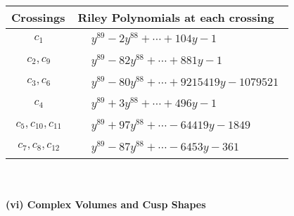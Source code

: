 \documentclass[1p]{elsarticle_modified}
\theoremstyle{definition}
\begin{document}
\begin{tabular}{m{50pt}|m{274pt}}
Crossings & \hspace{64pt}Riley Polynomials at each crossing \\
\hline $$\begin{aligned}c_{1}\end{aligned}$$&$\begin{aligned}
&y^{89}-2 y^{88}+\cdots+104 y-1
\end{aligned}$\\
\hline $$\begin{aligned}c_{2},c_{9}\end{aligned}$$&$\begin{aligned}
&y^{89}-82 y^{88}+\cdots+881 y-1
\end{aligned}$\\
\hline $$\begin{aligned}c_{3},c_{6}\end{aligned}$$&$\begin{aligned}
&y^{89}-80 y^{88}+\cdots+9215419 y-1079521
\end{aligned}$\\
\hline $$\begin{aligned}c_{4}\end{aligned}$$&$\begin{aligned}
&y^{89}+3 y^{88}+\cdots+496 y-1
\end{aligned}$\\
\hline $$\begin{aligned}c_{5},c_{10},c_{11}\end{aligned}$$&$\begin{aligned}
&y^{89}+97 y^{88}+\cdots-64419 y-1849
\end{aligned}$\\
\hline $$\begin{aligned}c_{7},c_{8},c_{12}\end{aligned}$$&$\begin{aligned}
&y^{89}-87 y^{88}+\cdots-6453 y-361
\end{aligned}$\\
\hline
\end{tabular}\\~\\
\newpage\flushleft \textbf{(vi) Complex Volumes and Cusp Shapes}
\end{document}
